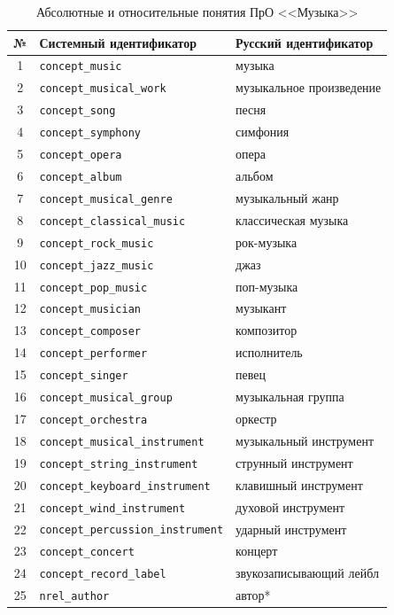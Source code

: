 \begin{table}[H]
\centering
\caption{Абсолютные и относительные понятия ПрО <<Музыка>>}
\label{tab:concepts}
\begin{tabular}{|c|p{6.2cm}|p{5.5cm}|}
\hline
№ & Системный идентификатор & Русский идентификатор \\
\hline
1 & \texttt{concept\_music} & музыка \\
2 & \texttt{concept\_musical\_work} & музыкальное произведение \\
3 & \texttt{concept\_song} & песня \\
4 & \texttt{concept\_symphony} & симфония \\
5 & \texttt{concept\_opera} & опера \\
6 & \texttt{concept\_album} & альбом \\
7 & \texttt{concept\_musical\_genre} & музыкальный жанр \\
8 & \texttt{concept\_classical\_music} & классическая музыка \\
9 & \texttt{concept\_rock\_music} & рок-музыка \\
10 & \texttt{concept\_jazz\_music} & джаз \\
11 & \texttt{concept\_pop\_music} & поп-музыка \\
12 & \texttt{concept\_musician} & музыкант \\
13 & \texttt{concept\_composer} & композитор \\
14 & \texttt{concept\_performer} & исполнитель \\
15 & \texttt{concept\_singer} & певец \\
16 & \texttt{concept\_musical\_group} & музыкальная группа \\
17 & \texttt{concept\_orchestra} & оркестр \\
18 & \texttt{concept\_musical\_instrument} & музыкальный инструмент \\
19 & \texttt{concept\_string\_instrument} & струнный инструмент \\
20 & \texttt{concept\_keyboard\_instrument} & клавишный инструмент \\
21 & \texttt{concept\_wind\_instrument} & духовой инструмент \\
22 & \texttt{concept\_percussion\_instrument} & ударный инструмент \\
23 & \texttt{concept\_concert} & концерт \\
24 & \texttt{concept\_record\_label} & звукозаписывающий лейбл \\
25 & \texttt{nrel\_author} & автор* \\

\end{tabular}
\end{table}
